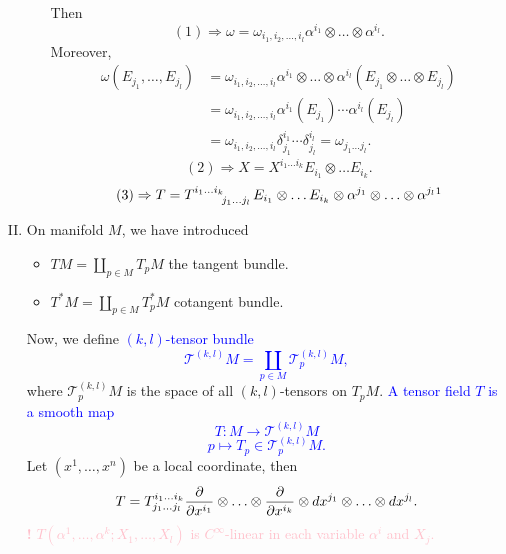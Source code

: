 \begin{enumerate}[(I)]
\begin{itemize}
Then 
\[(1)\Rightarrow \omega=\omega_{i_1,i_2,\ldots,i_l} \alpha^{i_1}
\otimes \ldots \otimes \alpha^{i_l}.\]
Moreover, \begin{align*}
    \omega\left(E_{j_1},\ldots,E_{j_l}\right)
    &= \omega_{i_1,i_2,\ldots,i_l} \alpha^{i_1}
    \otimes \ldots \otimes \alpha^{i_l}\left(
        E_{j_1}\otimes \ldots\otimes E_{j_l}
    \right)\\
    &=\omega_{i_1,i_2,\ldots,i_l}
    \alpha^{i_1}(E_{j_1})\cdots \alpha^{i_l}(E_{j_l})\\
    &=\omega_{i_1,i_2,\ldots,i_l}\delta^{i_1}_{j_1}\cdots 
    \delta^{i_l}_{j_l}=\omega_{j_1\ldots j_l}.
\end{align*}
\[
    (2)\Rightarrow X=X^{i_1\ldots i_k} E_{i_1}\otimes \ldots 
    E_{i_k}.
\]
\[
    (3)\Rightarrow T=\tensor{T}{^{i_1\ldots i_k}_{j_1\ldots j_l}}
    E_{i_1}\otimes \ldots E_{i_k}\otimes \alpha^{j_1}\otimes 
    \ldots \otimes \alpha^{j_l} 
    \footnotemark
\]
    \end{itemize}
    \item On manifold \(M\), we have introduced 
    \begin{itemize}
        \item \(TM=\coprod_{p\in M} T_p M\) the tangent bundle. 
        \item \(T^*M=\coprod_{p\in M}T^*_p M\) cotangent bundle.
    \end{itemize}
    Now, we define \textcolor{blue}{
        \((k,l)\)-tensor bundle
        \[
            \mathcal{T}^{(k,l)}M=\coprod_{p\in M}\mathcal{T}^{(k,l)}_p M,    
        \]
    }
where \(\mathcal{T}^{(k,l)}_p M\) is the space of all \((k,l)\)-tensors
on \(T_p M\).
\textcolor{blue}{A tensor field \(T\) is a smooth map
\[
    T\colon M\to  \mathcal{T}^{(k,l)}M   
\]
\[
    p\mapsto T_p\in \mathcal{T}^{(k,l)}_p M.    
\]}
Let \((x^1,\ldots,x^n)\) be a local coordinate, then 
\[
    T=\tensor*{T}{^{i_1\ldots i_k}_{j_1\ldots j_l}} 
    \pdv{x^{i_1}}\otimes \ldots \otimes \pdv{x^{i_k}}
    \otimes d x^{j_1} \otimes \ldots \otimes d x^{j_l}.  
\]
\textcolor{pink}{
    {\Large \textbf{!}} \(T\left(\alpha^1,\ldots,\alpha^k;
    X_1,\ldots,X_l\right)\) is \(C^\infty\)-linear in each variable 
    \(\alpha^i\) and \(X_j\).
}
\end{enumerate}
